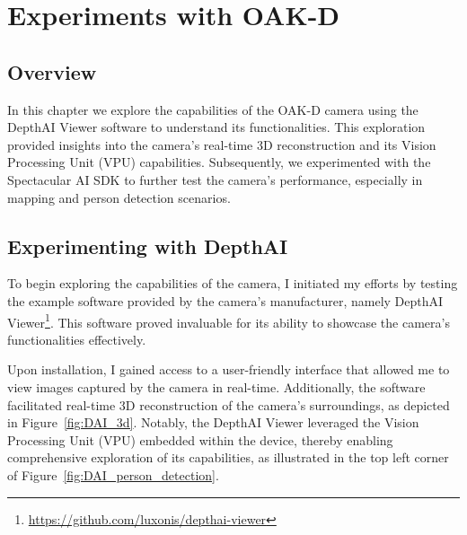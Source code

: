 \chapter{Experiments with OAK-D} \label{experiments_oak_d}

\section{Overview}


In this chapter we explore the capabilities of the OAK-D camera using the DepthAI Viewer software to understand its functionalities. This exploration provided insights into the camera's real-time 3D reconstruction and its Vision Processing Unit (VPU) capabilities. Subsequently, we experimented with the Spectacular AI SDK to further test the camera's performance, especially in mapping and person detection scenarios.


\section{Experimenting with DepthAI}

To begin exploring the capabilities of the camera, I initiated my efforts by testing the example software provided by the camera's manufacturer, namely DepthAI Viewer\footnote{\url{https://github.com/luxonis/depthai-viewer}}. This software proved invaluable for its ability to showcase the camera's functionalities effectively.

Upon installation, I gained access to a user-friendly interface that allowed me to view images captured by the camera in real-time. Additionally, the software facilitated real-time 3D reconstruction of the camera's surroundings, as depicted in Figure~\ref{fig:DAI_3d}. Notably, the DepthAI Viewer leveraged the Vision Processing Unit (VPU) embedded within the device, thereby enabling comprehensive exploration of its capabilities, as illustrated in the top left corner of Figure~\ref{fig:DAI_person_detection}.

